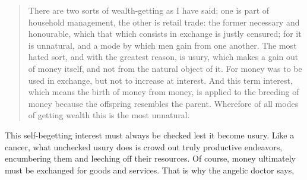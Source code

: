 \documentclass[letterpaper]{article}
\begin{document}
\begin{quote}
  There are two sorts of wealth-getting as I have said; one is part of household management, the other is retail trade: the former necessary and honourable, which that which consists in exchange is justly censured; for it is unnatural, and a mode by which men gain from one another. The most hated sort, and with the greatest reason, is usury, which makes a gain out of money itself, and not from the natural object of it. For money was to be used in exchange, but not to increase at interest. And this term interest, which means the birth of money from money, is applied to the breeding of money because the offspring resembles the parent. Wherefore of all modes of getting wealth this is the most unnatural.
\end{quote}

This self-begetting interest must always be checked lest it become usury. Like a cancer, what unchecked usury does is crowd out truly productive endeavors, encumbering them and leeching off their resources. Of course, money ultimately must be exchanged for goods and services. That is why the angelic doctor says,


\end{document}
